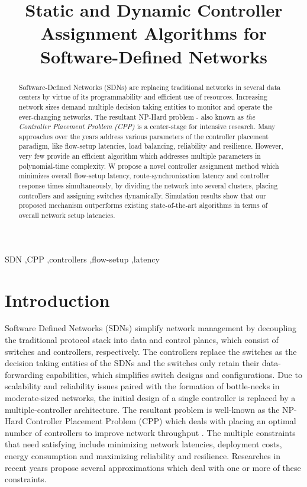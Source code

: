 \documentclass[preprint,12pt]{elsarticle}
\begin{document}
	\begin{frontmatter}
		\title{Static and Dynamic Controller Assignment Algorithms for Software-Defined Networks}
		
		
		\begin{abstract}
			Software-Defined Networks (SDNs) are replacing traditional networks in several data centers by virtue of its programmability and efficient use of resources. Increasing network sizes demand multiple decision taking entities to monitor and operate the ever-changing networks. The resultant NP-Hard problem - also known as \textit{the Controller Placement Problem (CPP)} is a center-stage for intensive research. Many approaches over the years address various parameters of the controller placement paradigm, like flow-setup latencies, load balancing, reliability and resilience. However, very few provide an efficient algorithm which addresses multiple parameters in polynomial-time complexity. W propose a novel controller assignment method which minimizes overall flow-setup latency, route-synchronization latency and controller response times simultaneously, by dividing the network into several clusters, placing controllers and assigning switches dynamically. Simulation results show that our proposed mechanism outperforms existing state-of-the-art algorithms in terms of overall network setup latencies.
		\end{abstract}
		\begin{keyword}
			SDN \sep CPP \sep controllers \sep flow-setup \sep latency
		\end{keyword}
		
	\end{frontmatter}

	\section{Introduction}
	Software Defined Networks (SDNs) simplify network management by decoupling the traditional protocol stack into data and control planes, which consist of switches and controllers, respectively. The controllers replace the switches as the decision taking entities of the SDNs and the switches only retain their data-forwarding capabilities, which simplifies switch designs and configurations. Due to scalability and reliability issues \cite{scalability2013dixit, scalability2013yeganeh} paired with the formation of bottle-necks in moderate-sized networks, the initial design of a single controller \cite{greene2009tr10} is replaced by a multiple-controller architecture. The resultant problem is well-known as the NP-Hard Controller Placement Problem (CPP) which deals with placing an optimal number of controllers to improve network throughput \cite{cppsurvey2017, cppsurvey2018, sdnsurvey2017}. The multiple constraints that need satisfying include minimizing network latencies, deployment costs, energy consumption and maximizing reliability and resilience. Researches in recent years propose several approximations which deal with one or more of these constraints.
	
\end{document}
